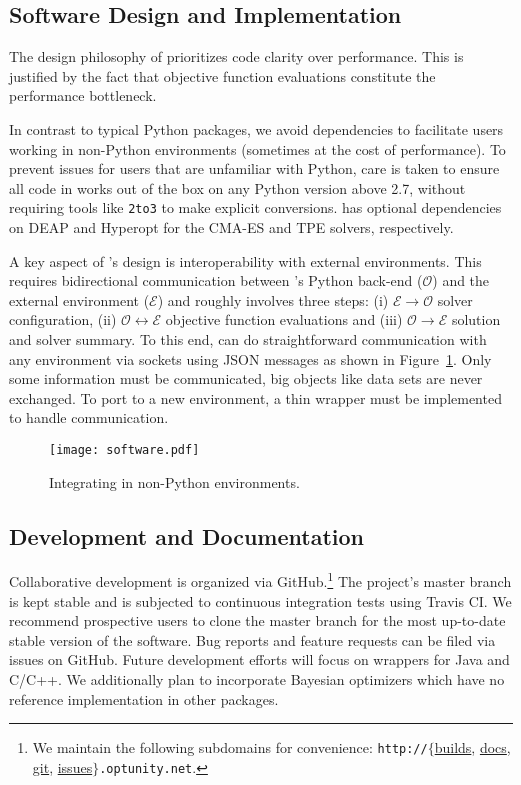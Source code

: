 \subsection{Software Design and Implementation}

The design philosophy of \optunity prioritizes code clarity over performance. This is justified by the fact that objective function evaluations constitute the performance bottleneck. 

In contrast to typical Python packages, we avoid dependencies to facilitate users working in non-Python environments (sometimes at the cost of performance). To prevent issues for users that are unfamiliar with Python, care is taken to ensure all code in \optunity works out of the box on any Python version above 2.7, without requiring tools like \texttt{2to3} to make explicit conversions. \optunity has optional dependencies on {\sc DEAP} \citep{fortin2012deap} and {\sc Hyperopt} \citep{bergstra2013hyperopt} for the CMA-ES and TPE solvers, respectively. 

A key aspect of \optunity's design is interoperability with external environments. This requires bidirectional communication between \optunity's Python back-end ($\mathcal{O}$) and the external environment ($\mathcal{E}$) and roughly involves three steps: (i) $\mathcal{E}\rightarrow\mathcal{O}$ solver configuration, (ii) $\mathcal{O}\leftrightarrow\mathcal{E}$ objective function evaluations and (iii) $\mathcal{O}\rightarrow\mathcal{E}$ solution and solver summary. To this end, \optunity can do straightforward communication with any environment via sockets using JSON messages as shown in Figure~\ref{fig:workflow}. Only some information must be communicated, big objects like data sets are never exchanged. To port \optunity to a new environment, a thin wrapper must be implemented to handle communication.

\begin{figure}[!h]
  \centering 
      \texttt{[image: software.pdf]} 
  \caption{Integrating \optunity in non-Python environments.}\label{fig:workflow}
\end{figure}

\subsection{Development and Documentation}
Collaborative development is organized via GitHub.\footnote{We maintain the following subdomains for convenience: \texttt{http://}$\{$\href{http://builds.optunity.net}{builds}, \href{http://docs.optunity.net}{docs}, \href{http://git.optunity.net}{git}, \href{http://issues.optunity.net}{issues}$\}$\texttt{.optunity.net}.} The project's master branch is kept stable and is subjected to continuous integration tests using Travis CI. 
We recommend prospective users to clone the master branch for the most up-to-date stable version of the software. Bug reports and feature requests can be filed via issues on GitHub. Future development efforts will focus on wrappers for Java and C/C++. We additionally plan to incorporate Bayesian optimizers which have no reference implementation in other packages. %

